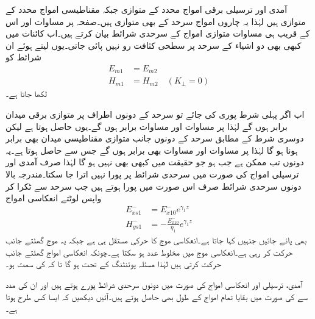آمدی اور ترسیلی برقی امواج  محدد کے متوازی جبکہ مقناطیسی امواج  محدد کے متوازی ہیں لہٰذا یہ چاروں امواج سرحد کے بھی متوازی ہیں۔صفحہ  پر مساوات  اور اس کے قریب ہی مساوات  متوازی امواج کے سرحدی شرائط بیان کرتے ہیں۔اب کائنات میں کبھی بھی دو اشیاء کے سرحد پر سطحی کثافت رو نہیں پائی جاتی۔یوں  لیتے ہوئے ان شرائط کو
\begin{align*}
E_{m1}&=E_{m2}\\
H_{m1}&=H_{m2} \quad(K_\perp=0)
\end{align*}
لکھا جاتا ہے۔

اب اگر پہلی شرط پوری کی جائے تو سرحد کے دونوں اطراف پر متوازی برقی میدان برابر ہوں گے  لہٰذا  پر مساوات  اور مساوات  برابر ہوں گے۔یوں  حاصل ہوتا ہے لیکن دوسری شرط کے مطابق سرحد کے دونوں جانب متوازی مقناطیسی میدان بھی برابر ہونا ہو گا لہٰذا  پر مساوات  اور مساوات  بھی برابر ہوں گے جس سے  حاصل ہوتا ہے۔یہ دونوں تب ممکن ہے جب  ہو جو حقیقت میں کبھی بھی نہیں ہو گا لہٰذا صرف آمدی اور ترسیلی امواج کی صورت میں سرحدی شرائط پر پورا نہیں اترا جا سکتا۔مندرجہ بالا دونوں سرحدی شرائط صرف اس صورت میں پورا ہوتے ہیں جب سرحد سے ٹکرا کر واپس لوٹتے انعکاسی امواج
\begin{align}
E_{xs1}^-&=E_{x10}^-e^{\gamma_1 z}\\
H_{ys1}^-&=-\frac{E_{x10}^-}{\eta_1} e^{\gamma_1 z}
\end{align}
 بھی پائے جائیں جنہیں  کہا جاتا ہے۔انعکاسی موج کا  حرکی مستقل  ہی ہے جبکہ یہ موج  گھٹتے  جانب حرکت کر رہی ہے۔انعکاسی موج میں  مخلوط عدد ہو سکتا ہے۔چونکہ انعکاسی امواج گھٹتے  جانب حرکت کرتی ہیں لہٰذا مسئلہ پوئنٹنگ کے تحت  ہو گا تا کہ  کی سمت  ہو۔

آمدی، ترسیلی اور انعکاسی امواج کی صورت میں دونوں سرحدی شرائط پورے ہوتے ہیں اور ان کی مدد سے  کی صورت میں بقایا تمام امواج کے طول بھی حاصل ہوتے ہیں۔آئیں دیکھیں کہ ایسا کس طرح ہوتا ہے۔

